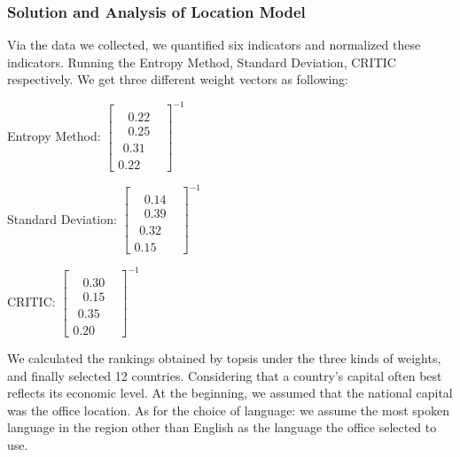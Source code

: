 \documentclass[12pt]{article}  %
\begin{document}
\subsubsection{Solution and Analysis of Location Model}

Via the data we collected, we quantified six indicators and normalized these indicators. Running the Entropy Method, Standard Deviation, CRITIC respectively. We get three different weight vectors as following:

\begin{center}
Entropy Method:
${\left[ {\begin{array}{*{20}{c}}
		{\begin{array}{*{20}{c}}
			{\begin{array}{*{20}{c}}
				{0.22}\\
				{0.25}
				\end{array}}\\
			{0.31}
			\end{array}}\\
		{0.22}
		\end{array}} \right]^{ - 1}}$
	
Standard Deviation:
${\left[ {\begin{array}{*{20}{c}}
		{\begin{array}{*{20}{c}}
			{\begin{array}{*{20}{c}}
				{0.14}\\
				{0.39}
				\end{array}}\\
			{0.32}
			\end{array}}\\
		{0.15}
		\end{array}} \right]^{ - 1}}$
		
CRITIC:
${\left[ {\begin{array}{*{20}{c}}
		{\begin{array}{*{20}{c}}
			{\begin{array}{*{20}{c}}
				{0.30}\\
				{0.15}
				\end{array}}\\
			{0.35}
			\end{array}}\\
		{0.20}
		\end{array}} \right]^{ - 1}}$
\end{center}

We calculated the rankings obtained by topsis under the three kinds of weights, and finally selected 12 countries. Considering that a country's capital often best reflects its economic level. At the beginning, we assumed that the national capital was the office location. As for the choice of language: we assume the most spoken language in the region other than English as the language the office selected to use.
\end{document}
